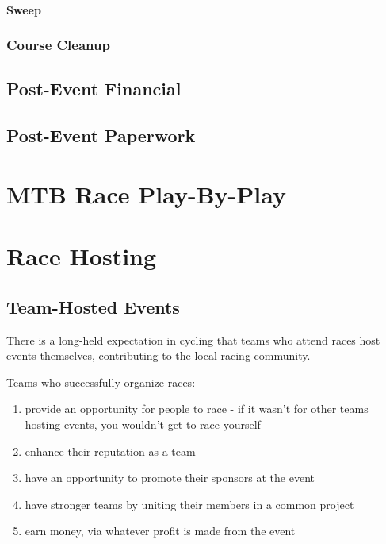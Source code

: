 \documentclass[
  letterpaper, %
  fontsize=10pt, %
  twoside=true,
  chapterentrydots=true, %
  numbers=noenddot,
  fontmethod=tex,
]{kaobook}
\begin{document}
\subsubsection{Sweep}

\subsection{Course Cleanup}

\section{Post-Event Financial}

\section{Post-Event Paperwork}

\setchapterpreamble[u]{\margintoc}
\chapter{MTB Race Play-By-Play}



\setchapterpreamble[u]{\margintoc}
\chapter{Race Hosting}

\section{Team-Hosted Events}

There is a long-held expectation in cycling that teams who attend races host events themselves,
contributing to the local racing community.

Teams who successfully organize races:
\begin{enumerate}
  \item provide an opportunity for people to race - if it wasn't for other teams hosting events, you wouldn't get to race yourself
  \item enhance their reputation as a team
  \item have an opportunity to promote their sponsors at the event
  \item have stronger teams by uniting their members in a common project
  \item earn money, via whatever profit is made from the event
\end{enumerate}
\end{document}
